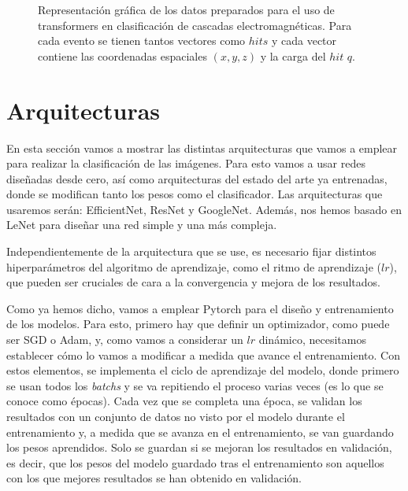 \documentclass[a4paper,12pt,oneside,titlepage]{book}
\begin{document}
\begin{figure}
  \caption{Representación gráfica de los datos preparados para el uso de transformers en clasificación de cascadas electromagnéticas. Para cada evento se tienen tantos vectores como $hits$ y cada vector contiene las coordenadas espaciales $(x, y, z)$ y la carga del $hit$ $q$.}
  \label{fig:rep_transformer}
\end{figure}

\section{Arquitecturas}

En esta sección vamos a mostrar las distintas arquitecturas que vamos a emplear para realizar la clasificación de las imágenes. Para esto vamos a usar redes diseñadas desde cero, así como arquitecturas del estado del arte ya entrenadas, donde se modifican tanto los pesos como el clasificador. Las arquitecturas que usaremos serán: EfficientNet, ResNet y GoogleNet. Además, nos hemos basado en LeNet para diseñar una red simple y una más compleja.
 
Independientemente de la arquitectura que se use, es necesario fijar distintos hiperparámetros del algoritmo de aprendizaje, como el ritmo de aprendizaje ($lr$), que pueden ser cruciales de cara a la convergencia y mejora de los resultados.

Como ya hemos dicho, vamos a emplear Pytorch para el diseño y entrenamiento de los modelos. Para esto, primero hay que definir un optimizador, como puede ser SGD o Adam, y, como vamos a considerar un $lr$ dinámico, necesitamos establecer cómo lo vamos a modificar a medida que avance el entrenamiento. Con estos elementos, se implementa el ciclo de aprendizaje del modelo, donde primero se usan todos los \textit{batchs} y se va repitiendo el proceso varias veces (es lo que se conoce como épocas). Cada vez que se completa una época, se validan los resultados con un conjunto de datos no visto por el modelo durante el entrenamiento y, a medida que se avanza en el entrenamiento, se van guardando los pesos aprendidos. Solo se guardan si se mejoran los resultados en validación, es decir, que los pesos del modelo guardado tras el entrenamiento son aquellos con los que mejores resultados se han obtenido en validación.
 
\end{document}
